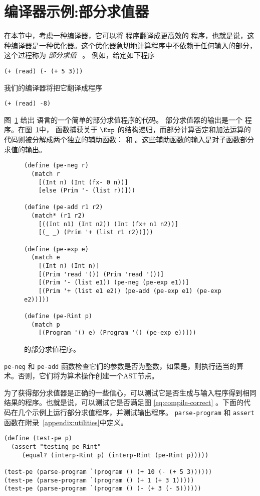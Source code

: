 \documentclass[11pt]{book}
\begin{document}
\section{编译器示例:部分求值器}
\label{sec:partial-evaluation}

在本节中，考虑一种编译器，它可以将 \LangInt{} 程序翻译成更高效的 \LangInt{} 程序，也就是说，这种编译器是一种优化器。这个优化器急切地计算程序中不依赖于任何输入的部分，这个过程称为
\emph{部分求值}~\citep{Jones:1993uq} 。
例如，给定如下程序
\begin{lstlisting}
(+ (read) (- (+ 5 3)))
\end{lstlisting}
我们的编译器将把它翻译成程序
\begin{lstlisting}
(+ (read) -8)
\end{lstlisting}

图~\ref{fig:pe-arith} 给出 \LangInt{} 语言的一个简单的部分求值程序的代码。 部分求值器的输出是一个 \LangInt{} 程序。在图~\ref{fig:pe-arith}中，  函数捕获关于 $\Exp$ 的结构递归，而部分计算否定和加法运算的代码则被分解成两个独立的辅助函数：
 和  。这些辅助函数的输入是对子函数部分求值的输出。

\begin{figure}[tp]
\begin{lstlisting}
(define (pe-neg r)
  (match r
    [(Int n) (Int (fx- 0 n))]
    [else (Prim '- (list r))]))

(define (pe-add r1 r2)
  (match* (r1 r2)
    [((Int n1) (Int n2)) (Int (fx+ n1 n2))]
    [(_ _) (Prim '+ (list r1 r2))]))

(define (pe-exp e)
  (match e
    [(Int n) (Int n)]
    [(Prim 'read '()) (Prim 'read '())]
    [(Prim '- (list e1)) (pe-neg (pe-exp e1))]
    [(Prim '+ (list e1 e2)) (pe-add (pe-exp e1) (pe-exp e2))]))

(define (pe-Rint p)
  (match p
    [(Program '() e) (Program '() (pe-exp e))]))
\end{lstlisting}
\caption{ \LangInt{} 的部分求值程序。}
\label{fig:pe-arith}
\end{figure}

\texttt{pe-neg} 和 \texttt{pe-add} 函数检查它们的参数是否为整数，如果是，则执行适当的算术。否则，它们将为算术操作创建一个AST节点。

为了获得部分求值器是正确的一些信心，可以测试它是否生成与输入程序得到相同结果的程序。也就是说，可以测试它是否满足图
\ref{eq:compile-correct} 。下面的代码在几个示例上运行部分求值程序，并测试输出程序。
\texttt{parse-program} 和 \texttt{assert} 函数在附录~\ref{appendix:utilities}中定义。\\
\begin{minipage}{1.0\textwidth}
\begin{lstlisting}
(define (test-pe p)
  (assert "testing pe-Rint"
     (equal? (interp-Rint p) (interp-Rint (pe-Rint p)))))

(test-pe (parse-program `(program () (+ 10 (- (+ 5 3))))))
(test-pe (parse-program `(program () (+ 1 (+ 3 1)))))
(test-pe (parse-program `(program () (- (+ 3 (- 5))))))
\end{lstlisting}
\end{minipage}
\end{document}
